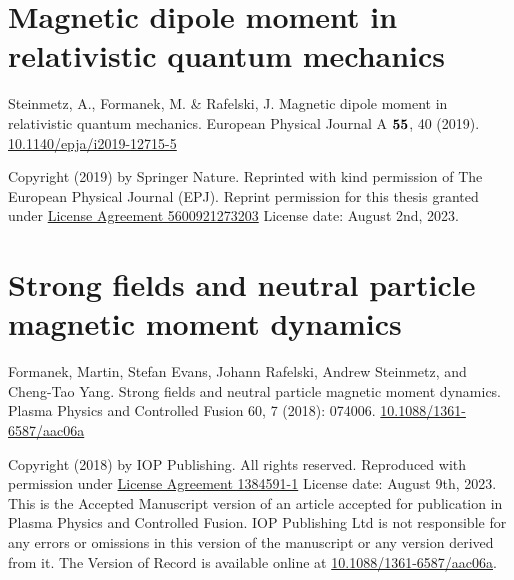 \chapter{Magnetic dipole moment in relativistic quantum mechanics}
\label{appendixA}
\begin{center}
Steinmetz, A., Formanek, M. \& Rafelski, J. Magnetic dipole moment in relativistic quantum mechanics. European Physical Journal A $\boldsymbol{55}$, 40 (2019). \href{https://doi.org/10.1140/epja/i2019-12715-5}{10.1140/epja/i2019-12715-5}
\end{center}

\noindent Copyright (2019) by Springer Nature. Reprinted with kind permission of The European Physical Journal (EPJ). Reprint permission for this thesis granted under \href{https://s100.copyright.com/CustomerAdmin/PLF.jsp?ref=9a7a42d0-4511-4427-8acd-73a16083772c}{License Agreement 5600921273203} License date: August 2nd, 2023.

%

\chapter{Strong fields and neutral particle magnetic moment dynamics}
\label{appendixB}
\begin{center}
Formanek, Martin, Stefan Evans, Johann Rafelski, Andrew Steinmetz, and Cheng-Tao Yang. Strong fields and neutral particle magnetic moment dynamics. Plasma Physics and Controlled Fusion 60, 7 (2018): 074006. \href{https://doi.org/10.1088/1361-6587/aac06a}{10.1088/1361-6587/aac06a}
\end{center}

\noindent Copyright (2018) by IOP Publishing. All rights reserved. Reproduced with permission under \href{https://marketplace.copyright.com/rs-ui-web/mp/license/56222509-d3e0-45fd-8ba6-f519e90d4d18/3a89c359-de4e-466f-93c3-ef1135413aab}{License Agreement 1384591-1} License date: August 9th, 2023. This is the Accepted Manuscript version of an article accepted for publication in Plasma Physics and Controlled Fusion. IOP Publishing Ltd is not responsible for any errors or omissions in this version of the manuscript or any version derived from it. The Version of Record is available online at \href{https://doi.org/10.1088/1361-6587/aac06a}{10.1088/1361-6587/aac06a}.

